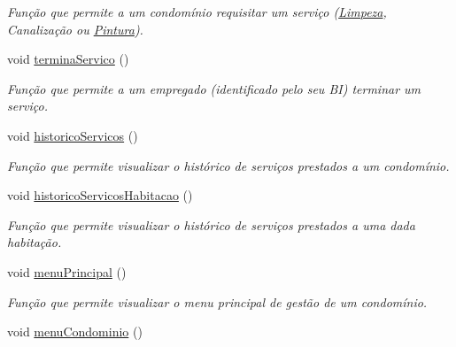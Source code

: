 \begin{DoxyCompactItemize}
\begin{DoxyCompactList}\small\item\em Função que permite a um condomínio requisitar um serviço (\hyperlink{class_limpeza}{Limpeza}, Canalização ou \hyperlink{class_pintura}{Pintura}). \end{DoxyCompactList}\item 
void \hyperlink{class_interface_a4a258bbbcf8d46cf0301bb8ca1792966}{termina\+Servico} ()\hypertarget{class_interface_a4a258bbbcf8d46cf0301bb8ca1792966}{}\label{class_interface_a4a258bbbcf8d46cf0301bb8ca1792966}

\begin{DoxyCompactList}\small\item\em Função que permite a um empregado (identificado pelo seu BI) terminar um serviço. \end{DoxyCompactList}\item 
void \hyperlink{class_interface_a6b95f930f246c8a802873d3f84798d8a}{historico\+Servicos} ()\hypertarget{class_interface_a6b95f930f246c8a802873d3f84798d8a}{}\label{class_interface_a6b95f930f246c8a802873d3f84798d8a}

\begin{DoxyCompactList}\small\item\em Função que permite visualizar o histórico de serviços prestados a um condomínio. \end{DoxyCompactList}\item 
void \hyperlink{class_interface_a9c249ee70e15d13ceaa4b88b7e2ad4d2}{historico\+Servicos\+Habitacao} ()\hypertarget{class_interface_a9c249ee70e15d13ceaa4b88b7e2ad4d2}{}\label{class_interface_a9c249ee70e15d13ceaa4b88b7e2ad4d2}

\begin{DoxyCompactList}\small\item\em Função que permite visualizar o histórico de serviços prestados a uma dada habitação. \end{DoxyCompactList}\item 
void \hyperlink{class_interface_a417dd813f30bf427f6dd1fe57887a685}{menu\+Principal} ()\hypertarget{class_interface_a417dd813f30bf427f6dd1fe57887a685}{}\label{class_interface_a417dd813f30bf427f6dd1fe57887a685}

\begin{DoxyCompactList}\small\item\em Função que permite visualizar o menu principal de gestão de um condomínio. \end{DoxyCompactList}\item 
void \hyperlink{class_interface_a29d77218d33dab2c23a6c064b5f699db}{menu\+Condominio} ()\hypertarget{class_interface_a29d77218d33dab2c23a6c064b5f699db}{}\label{class_interface_a29d77218d33dab2c23a6c064b5f699db}


\end{DoxyCompactItemize}
